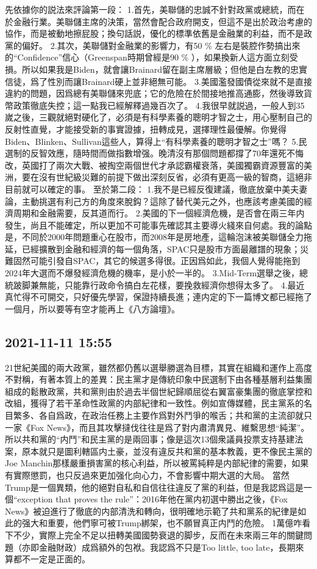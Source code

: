 \documentclass[twocolumn]{ctexart}
\begin{document}
先依據你的説法來評論第一段：
1.首先，美聯儲的忠誠不針對政黨或總統，而在於金融行業。美聯儲主席的決策，當然會配合政府開支，但這不是出於政治考慮的協作，而是被動地擦屁股；換句話説，優化的標準依舊是金融業的利益，而不是政黨的偏好。
2.其次，美聯儲對金融業的影響力，有50 \% 左右是裝腔作勢搞出來的“Confidence”信心（Greenspan時期曾經是90 \% ），如果換新人這方面立刻受損。所以如果我是Biden，就會讓Brainard留在副主席層級；但他是白左教的忠實信徒，爲了性別而讓Brainard硬上並非絕無可能。
3.美國濫發國債從來就不是直接違約的問題，因爲總有美聯儲來兜底；它的危險在於間接地推高通膨，然後導致貨幣政策徹底失控；這一點我已經解釋過幾百次了。
4.我很早就説過，一般人到35嵗之後，三觀就絕對硬化了，必須是有科學素養的聰明才智之士，用心壓制自己的反射性直覺，才能接受新的事實證據，扭轉成見，選擇理性最優解。你覺得Biden、Blinken、Sullivan這些人，算得上“有科學素養的聰明才智之士”嗎？
5.民選制的反智效應，隨時間而做指數增强。晚清沒有那個問題都撐了70年還死不悔改，英國打了兩次大戰、被掏空兩個世代才承認霸權衰落，美國獨霸資源豐富的美洲，要在沒有世紀級災難的前提下做出深刻反省，必須有更高一級的智商，這絕非目前就可以確定的事。
至於第二段：
1.我不是已經反復建議，徹底放棄中美夫妻論，主動挑選有利己方的角度來脫鈎？這除了替代美元之外，也應該考慮美國的經濟周期和金融需要，反其道而行。
2.美國的下一個經濟危機，是否會在兩三年内發生，尚且不能確定，所以更加不可能事先確認其主要導火綫來自何處。我的論點是，不同於2000年問題重心在股市，而2008年是房地產，這輪泡沫被美聯儲全力拖延，已經擴散到金融和經濟的每一個角落，SPAC只是股市方面最離譜的現象；災難固然可能引發自SPAC，其它的候選多得很。正因爲如此，我個人覺得能拖到2024年大選而不爆發經濟危機的機率，是小於一半的。
3.Mid-Term選舉之後，總統跛脚兼無能，只能靠行政命令搞白左花樣，要挽救經濟你想得太多了。
4.最近真忙得不可開交，只好優先學習，保證持續長進；連内定的下一篇博文都已經拖了一個月，所以要等有空才能再上《八方論壇》。
\subsection*{2021-11-11 15:55}

21世紀美國的兩大政黨，雖然都仍舊以選舉勝選為目標，其實在組織和運作上高度不對稱，有著本質上的差異：民主黨才是傳統印象中民選制下由各種基層利益集團組成的鬆散政黨，共和黨則由於過去半個世紀歸順屈從右翼富豪集團的徹底掌控和改組，獲得了若干革命性政黨的内部紀律和一致性。例如宣傳媒體，民主黨系的名目繁多、各自爲政，在政治任務上主要作爲對外鬥爭的喉舌；共和黨的主流卻就只一家《Fox News》，而且其攻擊撻伐往往是爲了對内肅清異見、維繫思想“純潔”。所以共和黨的“内鬥”和民主黨的是兩回事；像是這次13個衆議員投票支持基建法案，原本就只是圖利轄區内土豪，並沒有違反共和黨的基本教義，更不像民主黨的Joe Manchin那樣嚴重損害黨的核心利益，所以被罵純粹是内部紀律的需要，如果有實際懲罰，也只反過來更加强化向心力，不會影響中期大選的大局。
當然Trump是一個異類，他的絕對自私和自信往往違反了黨的利益，但是我認爲這是一個“exception that proves the rule”：2016年他在黨内初選中勝出之後，《Fox News》被迫進行了徹底的内部清洗和轉向，很明確地示範了共和黨系的紀律是如此的强大和重要，他們寧可被Trump綁架，也不願冒真正内鬥的危險。
1萬億咋看下不少，實際上完全不足以扭轉美國國勢衰退的脚步，反而在未來兩三年的關鍵問題（亦即金融財政）成爲額外的包袱。我認爲不只是Too little, too late，長期來算都不一定是正面的。
\end{document}
